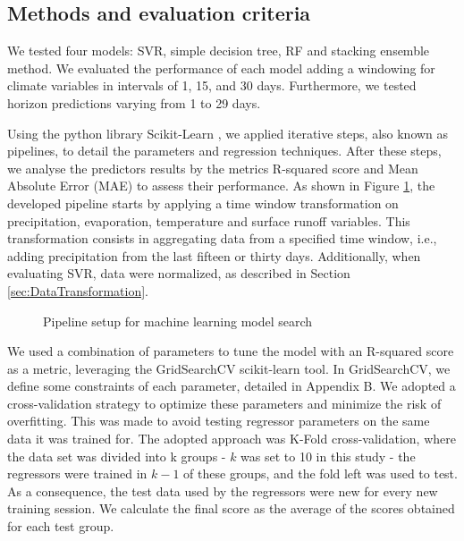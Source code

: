 \documentclass[12pt]{article}
\begin{document}

\subsection{Methods and evaluation criteria}
\label{ssec:MethodsEvaluation}

We tested four models: SVR, simple decision tree, RF and stacking ensemble method. We evaluated the performance of each model adding a windowing for climate variables in intervals of 1, 15, and 30 days. Furthermore, we tested horizon predictions varying from 1 to 29 days.

Using the python library Scikit-Learn \cite{scikit-learn}, we applied iterative steps, also known as pipelines, to detail the parameters and regression techniques. After these steps, we analyse the predictors results by the metrics R-squared score and Mean Absolute Error (MAE) to assess their performance. As shown in Figure \ref{fig:pipelines}, the developed pipeline starts by applying a time window transformation on precipitation, evaporation, temperature and surface runoff variables. This transformation consists in aggregating data from a specified time window, i.e., adding precipitation from the last fifteen or thirty days. Additionally, when evaluating SVR, data were normalized, as described in Section \ref{sec:DataTransformation}.

\begin{figure}[htb]
    \centering
    {\footnotesize}
    \caption{Pipeline setup for machine learning model search}
    \label{fig:pipelines}
\end{figure}

We used a combination of parameters to tune the model with an R-squared score as a metric, leveraging the GridSearchCV scikit-learn tool. In GridSearchCV, we define some constraints of each parameter, detailed in Appendix B. We adopted a cross-validation strategy to optimize these parameters and minimize the risk of overfitting. This was made to avoid testing regressor parameters on the same data it was trained for. The adopted approach was K-Fold cross-validation, where the data set was divided into k groups - $k$ was set to 10 in this study - the regressors were trained in $k-1$ of these groups, and the fold left was used to test. As a consequence, the test data used by the regressors were new for every new training session. We calculate the final score as the average of the scores obtained for each test group.
\end{document}
